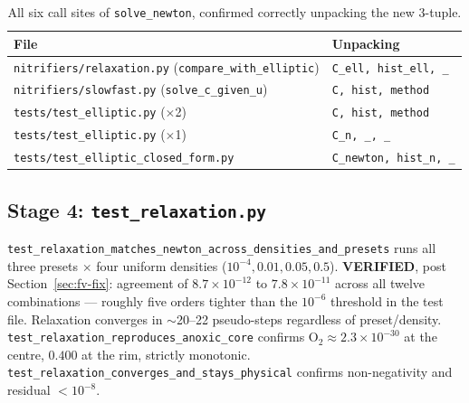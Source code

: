 \documentclass[11pt]{article}
\newcommand{\verified}{\textcolor{green!45!black}{\textbf{VERIFIED}}}
\newcommand{\code}[1]{\texttt{#1}}
\newcommand{\test}[1]{\texttt{\small #1}}
\begin{document}
\begin{table}[h]
\centering
\small
\begin{tabular}{ll}
\toprule
File & Unpacking \\
\midrule
\code{nitrifiers/relaxation.py} (\code{compare\_with\_elliptic}) & \code{C\_ell, hist\_ell, \_} \\
\code{nitrifiers/slowfast.py} (\code{solve\_c\_given\_u}) & \code{C, hist, method} \\
\code{tests/test\_elliptic.py} ($\times$2) & \code{C, hist, method} \\
\code{tests/test\_elliptic.py} ($\times$1) & \code{C\_n, \_, \_} \\
\code{tests/test\_elliptic\_closed\_form.py} & \code{C\_newton, hist\_n, \_} \\
\bottomrule
\end{tabular}
\caption{All six call sites of \code{solve\_newton}, confirmed correctly unpacking the new 3-tuple.}
\label{tab:callsites}
\end{table}

\subsection{Stage 4: \code{test\_relaxation.py}}
\test{test\_relaxation\_matches\_newton\_across\_densities\_and\_presets} runs
all three presets $\times$ four uniform densities
($10^{-4},0.01,0.05,0.5$). \verified{}, post Section~\ref{sec:fv-fix}:
agreement of $8.7\times10^{-12}$ to $7.8\times10^{-11}$ across all twelve
combinations --- roughly five orders tighter than the $10^{-6}$ threshold in
the test file. Relaxation converges in $\sim$20--22 pseudo-steps regardless
of preset/density.
\test{test\_relaxation\_reproduces\_anoxic\_core} confirms O$_2\approx
2.3\times10^{-30}$ at the centre, $0.400$ at the rim, strictly monotonic.
\test{test\_relaxation\_converges\_and\_stays\_physical} confirms
non-negativity and residual $<10^{-8}$.
\end{document}
